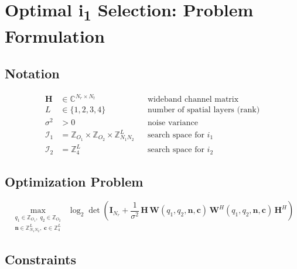 \documentclass[12pt, a4paper]{article}
\newcommand{\bH}{\mathbf{H}}
\newcommand{\bW}{\mathbf{W}}
\newcommand{\bI}{\mathbf{I}}
\newcommand{\C}{\mathbb{C}}
\newcommand{\Z}{\mathbb{Z}}
\begin{document}
\section{Optimal i\textsubscript{1} Selection: Problem Formulation}

\subsection{Notation}

\begin{align*}
    \bH &\in \C^{N_r \times N_t} && \text{wideband channel matrix} \\
    L   &\in \{1, 2, 3, 4\}     && \text{number of spatial layers (rank)} \\
    \sigma^2 &> 0                && \text{noise variance} \\
    \mathcal{I}_1 &= \Z_{O_1} \times \Z_{O_2} \times \Z_{N_1 N_2}^L && \text{search space for } i_1 \\
    \mathcal{I}_2 &= \Z_4^L    && \text{search space for } i_2
\end{align*}

\subsection{Optimization Problem}

\begin{equation}
\boxed{
    \max_{\substack{q_1 \in \Z_{O_1},\; q_2 \in \Z_{O_2} \\
                    \mathbf{n} \in \Z_{N_1 N_2}^L,\; \mathbf{c} \in \Z_4^L}}
    \;\log_2 \det\!\left(
        \bI_{N_r} + \frac{1}{\sigma^2}\,
        \bH\,\bW(q_1, q_2, \mathbf{n}, \mathbf{c})\,
        \bW^H(q_1, q_2, \mathbf{n}, \mathbf{c})\,\bH^H
    \right)
}
\label{eq:opt_problem}
\end{equation}

\subsection{Constraints}
\end{document}

